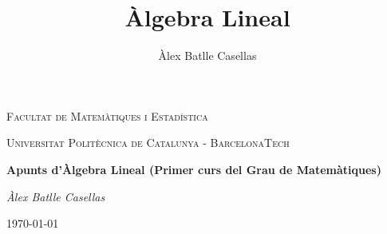 \documentclass[11pt]{article}
\title{Àlgebra Lineal}
\author{Àlex Batlle Casellas}
\begin{document}
\begin{titlepage}
	\centering
	{\scshape\LARGE Facultat de Matemàtiques i Estadística \par}
	\vspace{1cm}
	{\scshape\Large Universitat Politècnica de Catalunya - BarcelonaTech\par}
	\vspace{1.5cm}
	{\huge\bfseries Apunts d'Àlgebra Lineal (Primer curs del Grau de Matemàtiques)
	\par}
	\vspace{2cm}
	{\Large\itshape Àlex Batlle Casellas\par}

	\vfill

	{\large \today\par}
\end{titlepage}


\vfill
\newpage

\tableofcontents
\newpage
\end{document}
